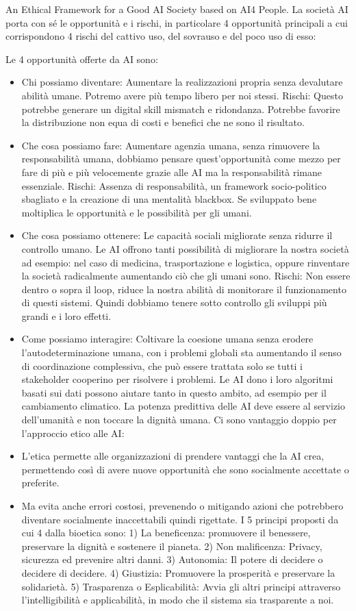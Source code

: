 \documentclass[11pt, a4page, twocolumn]{article}
\begin{document}
An Ethical Framework for a Good AI Society based on AI4 People.
La società AI porta con sé le opportunità e i rischi, in particolare 4 opportunità principali a cui corrispondono 4 rischi del cattivo uso, del sovrauso e del poco uso di esso:

Le 4 opportunità offerte da AI sono:
\begin{itemize}
    \item Chi possiamo diventare: Aumentare la realizzazioni propria senza devalutare abilità umane. Potremo avere più tempo libero per noi stessi.
    Rischi: Questo potrebbe generare un digital skill mismatch e ridondanza. Potrebbe favorire la distribuzione non equa di costi e benefici che ne sono il risultato. 
    \item Che cosa possiamo fare: Aumentare agenzia umana, senza rimuovere la responsabilità umana, dobbiamo pensare quest’opportunità come mezzo per fare di più e più velocemente grazie alle AI ma la responsabilità rimane essenziale.
     Rischi: Assenza di responsabilità, un framework socio-politico sbagliato e la creazione di una mentalità blackbox.
	Se sviluppato bene moltiplica le opportunità e le possibilità per gli umani.
    \item Che cosa possiamo ottenere: Le capacità sociali migliorate senza ridurre il controllo umano.
    Le AI offrono tanti possibilità di migliorare la nostra società ad esempio: nel caso di medicina, trasportazione e logistica, oppure rinventare la società radicalmente aumentando ciò che gli umani sono.
    Rischi: Non essere dentro o sopra il loop, riduce la nostra abilità di monitorare il funzionamento di questi sistemi.
    Quindi dobbiamo tenere sotto controllo gli sviluppi più grandi e i loro effetti.
    \item Come possiamo interagire: Coltivare la coesione umana senza erodere l’autodeterminazione umana, con i problemi globali sta aumentando il senso di coordinazione complessiva, che può essere trattata solo se tutti i stakeholder cooperino per risolvere i problemi. Le AI dono i loro algoritmi basati sui dati possono aiutare tanto in questo ambito, ad esempio per il cambiamento climatico. La potenza predittiva delle AI deve essere al servizio dell’umanità e non toccare la dignità umana.
Ci sono vantaggio doppio per l’approccio etico alle AI:
    \item L’etica permette alle organizzazioni di prendere vantaggi che la AI crea, permettendo così di avere nuove opportunità che sono socialmente accettate o preferite.
    \item Ma evita anche errori costosi, prevenendo o mitigando azioni che potrebbero diventare socialmente inaccettabili quindi rigettate.
I 5 principi proposti da cui 4 dalla bioetica sono: 1) La beneficenza: promuovere il benessere, preservare la dignità e sostenere il pianeta. 2) Non malificenza: Privacy, sicurezza ed prevenire altri danni. 3) Autonomia: Il potere di decidere o decidere di decidere. 4) Giustizia: Promuovere la prosperità e preservare la solidarietà. 5) Trasparenza o Esplicabilità: Avvia gli altri principi attraverso l’intelligibilità e applicabilità, in modo che il sistema sia trasparente a noi.
\end{itemize}
\end{document}

